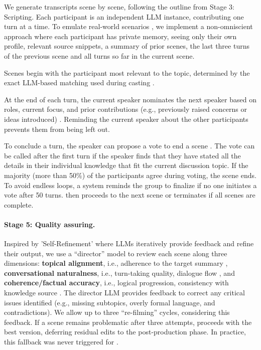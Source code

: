 We generate transcripts scene by scene, following the outline from Stage 3: Scripting.
Each participant is an independent LLM instance, contributing one turn at a time.
To emulate real-world scenarios \cite{ZhouSEK24}, we implement a non-omniscient approach where each participant has private memory, seeing only their own profile, relevant source snippets, a summary of prior scenes, the last three turns of the previous scene and all turns so far in the current scene.

Scenes begin with the participant most relevant to the topic, determined by the exact LLM-based matching used during casting \cite{LiWXG25}.

At the end of each turn, the current speaker nominates the next speaker based on roles, current focus, and prior contributions (e.g., previously raised concerns or ideas introduced) \cite{NonomuraM24a}.
Reminding the current speaker about the other participants prevents them from being left out.

To conclude a turn, the speaker can propose a vote to end a scene \cite{WangWST24a}.
The vote can be called after the first turn if the speaker finds that they have stated all the details in their individual knowledge that fit the current discussion topic.
If the majority (more than 50\%) of the participants agree during voting, the scene ends.
To avoid endless loops, a system reminds the group to finalize if no one initiates a vote after 50 turns.
\pipeline{} then proceeds to the next scene or terminates if all scenes are complete.



\paragraph{Stage 5: Quality assuring.}
Inspired by 'Self-Refinement' \cite{MadaanTGH23b} where LLMs iteratively provide feedback and refine their output, we use a ``director'' model to review each scene along three dimensions: \textbf{topical alignment}, i.e., adherence to the target summary \cite{LinC23}, \textbf{conversational naturalness}, i.e., turn-taking quality, dialogue flow \cite{LiuIXW23}, and \textbf{coherence/factual accuracy}, i.e., logical progression, consistency with knowledge source \cite{XieZPJ24}.
The director LLM provides feedback to correct any critical issues identified (e.g., missing subtopics, overly formal language, and contradictions).
We allow up to three ``re-filming'' cycles, considering this feedback.
If a scene remains problematic after three attempts, \pipeline{} proceeds with the best version, deferring residual edits to the post-production phase.
In practice, this fallback was never triggered for \dataset{}.


